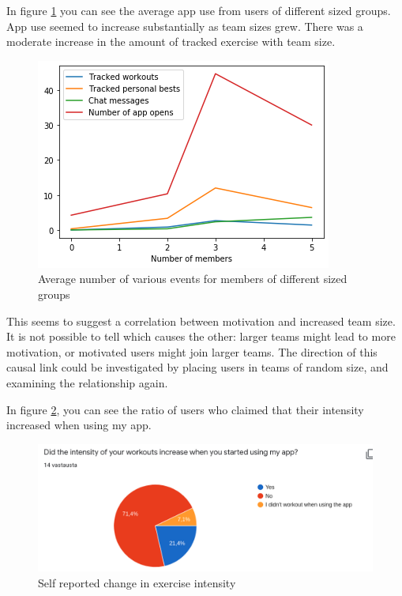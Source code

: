 \documentclass{l4proj}
\begin{document}
In figure \ref{fig:exercises} you can see the average app use from users of different sized groups. App use seemed to increase substantially as team sizes grew. There was a moderate increase in the amount of tracked exercise with team size.
\begin{figure}[H]
    \centering
    \includegraphics[width=1.0\linewidth]{data/activity.png}    
    \caption{Average number of various events for members of different sized groups}
    \label{fig:exercises} 
\end{figure}
This seems to suggest a correlation between motivation and increased team size. It is not possible to tell which causes the other: larger teams might lead to more motivation, or motivated users might join larger teams. The direction of this causal link could be investigated by placing users in teams of random size, and examining the relationship again.


In figure \ref{fig:intensity}, you can see the ratio of users who claimed that their intensity increased when using my app.
\begin{figure}[H]
    \centering
    \includegraphics[width=1.0\linewidth]{exercise_intensity.png}    
    \caption{Self reported change in exercise intensity}
    \label{fig:intensity} 
\end{figure}
\end{document}
